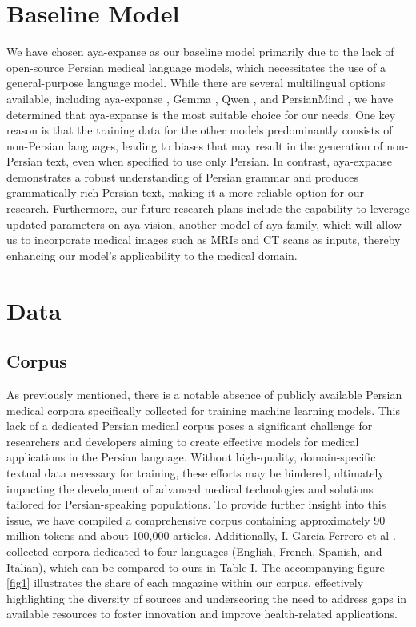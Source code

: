 \documentclass[conference]{IEEEtran}
\begin{document}
\section{Baseline Model}
We have chosen aya-expanse as our baseline model primarily due to the lack of open-source Persian medical language models, which necessitates the use of a general-purpose language model. While there are several multilingual options available, including aya-expanse \cite{b5}, Gemma \cite{b14}, Qwen \cite{b15}, and PersianMind \cite{b16}, we have determined that aya-expanse is the most suitable choice for our needs. One key reason is that the training data for the other models predominantly consists of non-Persian languages, leading to biases that may result in the generation of non-Persian text, even when specified to use only Persian. In contrast, aya-expanse demonstrates a robust understanding of Persian grammar and produces grammatically rich Persian text, making it a more reliable option for our research. Furthermore, our future research plans include the capability to leverage updated parameters on aya-vision, another model of aya family, which will allow us to incorporate medical images such as MRIs and CT scans as inputs, thereby enhancing our model’s applicability to the medical domain.
\section{Data}

\subsection{Corpus}
As previously mentioned, there is a notable absence of publicly available Persian medical corpora specifically collected for training machine learning models. This lack of a dedicated Persian medical corpus poses a significant challenge for researchers and developers aiming to create effective models for medical applications in the Persian language. Without high-quality, domain-specific textual data necessary for training, these efforts may be hindered, ultimately impacting the development of advanced medical technologies and solutions tailored for Persian-speaking populations. To provide further insight into this issue, we have compiled a comprehensive corpus containing approximately 90 million tokens and about 100,000 articles. Additionally, I. Garcia Ferrero et al
\cite{b17}
. collected corpora dedicated to four languages (English, French, Spanish, and Italian), which can be compared to ours in Table I. The accompanying figure \ref{fig1} illustrates the share of each magazine within our corpus, effectively highlighting the diversity of sources and underscoring the need to address gaps in available resources to foster innovation and improve health-related applications.
\end{document}
